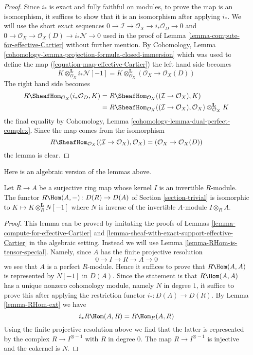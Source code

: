 \begin{proof}
Since $i_*$ is exact and fully faithful on modules, to prove the map is an
isomorphism, it suffices to show that it is an isomorphism after applying
$i_*$. We will use the short exact sequences
$0 \to \mathcal{I} \to \mathcal{O}_X \to i_*\mathcal{O}_D \to 0$
and
$0 \to \mathcal{O}_X \to \mathcal{O}_X(D) \to i_*\mathcal{N} \to 0$
used in the proof of Lemma \ref{lemma-compute-for-effective-Cartier}
without further mention. By
Cohomology, Lemma \ref{cohomology-lemma-projection-formula-closed-immersion}
which was used to define the map (\ref{equation-map-effective-Cartier})
the left hand side becomes
$$
K \otimes_{\mathcal{O}_X}^\mathbf{L} i_*\mathcal{N}[-1] =
K \otimes_{\mathcal{O}_X}^\mathbf{L} (\mathcal{O}_X \to \mathcal{O}_X(D))
$$
The right hand side becomes
\begin{align*}
R\SheafHom_{\mathcal{O}_X}(i_*\mathcal{O}_D, K) & =
R\SheafHom_{\mathcal{O}_X}((\mathcal{I} \to \mathcal{O}_X), K) \\
& =
R\SheafHom_{\mathcal{O}_X}((\mathcal{I} \to \mathcal{O}_X), \mathcal{O}_X)
\otimes_{\mathcal{O}_X}^\mathbf{L} K
\end{align*}
the final equality by
Cohomology, Lemma \ref{cohomology-lemma-dual-perfect-complex}.
Since the map comes from the isomorphism
$$
R\SheafHom_{\mathcal{O}_X}((\mathcal{I} \to \mathcal{O}_X), \mathcal{O}_X)
= (\mathcal{O}_X \to \mathcal{O}_X(D))
$$
the lemma is clear.
\end{proof}

\noindent
Here is an algebraic version of the lemmas above.

\begin{lemma}
\label{lemma-compute-for-effective-Cartier-algebraic}
Let $R \to A$ be a surjective ring map whose kernel $I$
is an invertible $R$-module. The functor
$R\Hom(A, -) : D(R) \to D(A)$ of Section \ref{section-trivial}
is isomorphic to $K \mapsto K \otimes_R^\mathbf{L} N[-1]$
where $N$ is inverse of the invertible $A$-module $I \otimes_R A$.
\end{lemma}

\begin{proof}
This lemma can be proved by imitating the proofs of
Lemmas \ref{lemma-compute-for-effective-Cartier} and
\ref{lemma-sheaf-with-exact-support-effective-Cartier}
in the algebraic setting. Instead we will use
Lemma \ref{lemma-RHom-is-tensor-special}.
Namely, since $A$ has the finite projective resolution
$$
0 \to I \to R \to A \to 0
$$
we see that $A$ is a perfect $R$-module. Hence it suffices
to prove that $R\Hom(A, A)$ is represented by $N[-1]$ in $D(A)$.
Since the statement is that $R\Hom(A, A)$ has a unique nonzero
cohomology module, namely $N$ in degree $1$, it suffice to prove
this after applying the restriction functor $i_* : D(A) \to D(R)$.
By Lemma \ref{lemma-RHom-ext}
we have
$$
i_*R\Hom(A, R) = R\Hom_R(A, R)
$$
Using the finite projective resolution above we find that the latter
is represented by the complex $R \to I^{\otimes -1}$ with $R$
in degree $0$. The map $R \to I^{\otimes -1}$ is injective
and the cokernel is $N$.
\end{proof}





